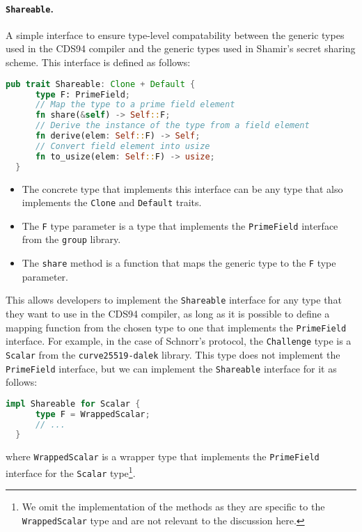 \paragraph{\texttt{Shareable}.} A simple interface to ensure type-level compatability between 
the generic types used in the CDS94 compiler and the generic types used in Shamir's secret sharing scheme.
This interface is defined as follows: 
\begin{lstlisting}[language=rust]
  pub trait Shareable: Clone + Default {
      type F: PrimeField;
      // Map the type to a prime field element
      fn share(&self) -> Self::F;
      // Derive the instance of the type from a field element
      fn derive(elem: Self::F) -> Self;
      // Convert field element into usize
      fn to_usize(elem: Self::F) -> usize;
  } 
\end{lstlisting}
\begin{itemize}
  \item The concrete type that implements this interface can be any type that also implements the \texttt{Clone} and
  \texttt{Default} traits. 
  \item The \texttt{F} type parameter is a type that implements the \texttt{PrimeField}
  interface from the \texttt{group} library. 
  \item The \texttt{share} method is a function that maps the generic
  type to the \texttt{F} type parameter.
\end{itemize}

This allows developers to implement the \texttt{Shareable} interface for any type that they want to use in the
CDS94 compiler, as long as it is possible to define a mapping function from the chosen type to one that 
implements the \texttt{PrimeField} interface. 
For example, in the case of Schnorr's protocol, the \texttt{Challenge} type is a \texttt{Scalar}
from the \texttt{curve25519-dalek} library. This type does not implement the \texttt{PrimeField} interface, but
we can implement the \texttt{Shareable} interface for it as follows:
\begin{lstlisting}[language=rust]
  impl Shareable for Scalar {
      type F = WrappedScalar;
      // ...
  }
\end{lstlisting}

where \texttt{WrappedScalar} is a wrapper type that implements the \texttt{PrimeField} interface for the 
\texttt{Scalar} type\footnote{We omit the implementation of the methods as they are specific to the 
\texttt{WrappedScalar} type and are not relevant to the discussion here.}.


